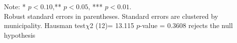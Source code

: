 \begin{table}[!htbp]
{\begin{threeparttable}
\begin{tabular}{lcccc}
\end{tabular}
     \begin{tablenotes}
     Note: * \(p<0.10\),** \(p<0.05\), *** \(p<0.01\). \\ Robust standard errors in parentheses. Standard errors are clustered by municipality. Hausman test\ensuremath{\chi}2 (12)= 13.115 \ensuremath{p}-value = 0.3608 rejects the null hypothesis 
     \end{tablenotes}
     \end{threeparttable}
     }
\end{table}
